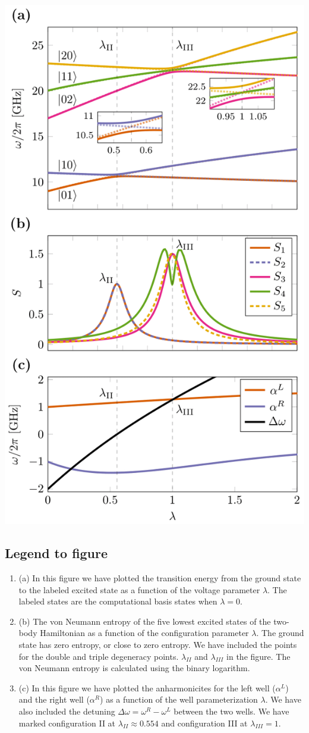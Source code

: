 \documentclass[%
oneside,                 %
final,                   %
10pt]{article}
\begin{document}
\centerline{\includegraphics[width=0.7\linewidth]{qcfigures/crossings-entropies-anharmonicities-1.png}}

\vspace{6mm}

\subsection{Legend to figure}

\begin{enumerate}
\item (a) In this figure we have plotted the transition energy from the ground state to the labeled excited state as a function of the voltage parameter $\lambda$. The labeled states are the computational basis states when $\lambda = 0$.

\item (b) The von Neumann entropy of the five lowest excited states of the two-body Hamiltonian as a function of the configuration parameter $\lambda$. The ground state has zero entropy, or close to zero entropy. We have included the points for the double and triple degeneracy points. $\lambda_{II}$ and $\lambda_{III}$ in the figure. The von Neumann entropy is calculated using the binary logarithm.

\item (c) In this figure we have plotted the anharmonicites for the left well ($\alpha^L$) and the right well ($\alpha^R$) as a function of the well parameterization $\lambda$. We have also included the detuning $\Delta \omega = \omega^R - \omega^L$ between the two wells. We have marked configuration II at $\lambda_{II} \approx 0.554$ and configuration III at $\lambda_{III} = 1$.
\end{enumerate}
\end{document}
